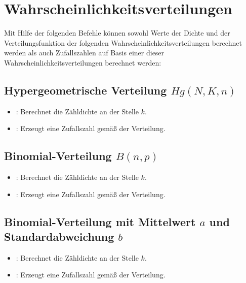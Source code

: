 \chapter{Wahrscheinlichkeitsverteilungen}\label{sec:Wahrscheinlichkeitsverteilungen}

Mit Hilfe der folgenden Befehle können sowohl Werte der Dichte und der Verteilungsfunktion
der folgenden Wahrscheinlichkeitsverteilungen berechnet werden als auch Zufallszahlen
auf Basis einer dieser Wahrscheinlichkeitsverteilungen berechnet werden:


\section{Hypergeometrische Verteilung \texorpdfstring{$Hg(N,K,n)$}{Hg(N,K,n)}}

\begin{itemize}

\item
{}:
Berechnet die Zähldichte an der Stelle $k$.

\item
{}:
Erzeugt eine Zufallszahl gemäß der Verteilung.

\end{itemize}



\section{Binomial-Verteilung \texorpdfstring{$B(n,p)$}{B(n,p)}}

\begin{itemize}

\item
{}:
Berechnet die Zähldichte an der Stelle $k$.


\item
{}:
Erzeugt eine Zufallszahl gemäß der Verteilung.

\end{itemize}



\section{Binomial-Verteilung mit Mittelwert \texorpdfstring{$a$}{a} und Standardabweichung \texorpdfstring{$b$}{b}}

\begin{itemize}

\item
{}:
Berechnet die Zähldichte an der Stelle $k$.


\item
{}:
Erzeugt eine Zufallszahl gemäß der Verteilung.

\end{itemize}



